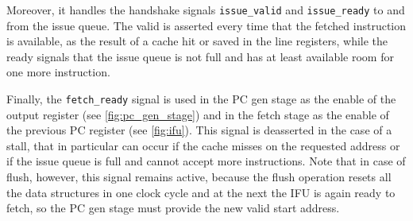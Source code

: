 Moreover, it handles the handshake signals \texttt{issue\_valid} and \texttt{issue\_ready} to and from the issue queue. The valid is asserted every time that the fetched instruction is available, as the result of a cache hit or saved in the line registers, while the ready signals that the issue queue is not full and has at least available room for one more instruction. 

Finally, the \texttt{fetch\_ready} signal is used in the \ac{PC} gen stage as the enable of the output register (see \cref{fig:pc_gen_stage}) and in the fetch stage as the enable of the previous \ac{PC} register (see \cref{fig:ifu}). This signal is deasserted in the case of a stall, that in particular can occur if the cache misses on the requested address or if the issue queue is full and cannot accept more instructions. Note that in case of flush, however, this signal remains active, because the flush operation resets all the data structures in one clock cycle and at the next the \ac{IFU} is again ready to fetch, so the \ac{PC} gen stage must provide the new valid start address.

